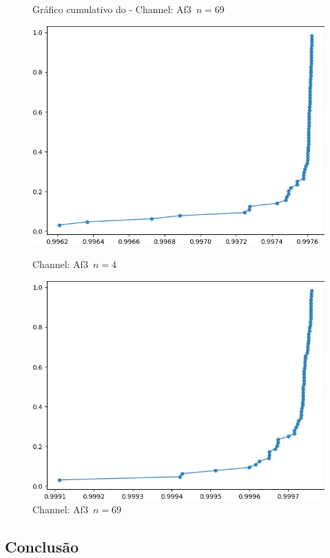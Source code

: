 \begin{figure}[ht]
  \caption{Gráfico cumulativo do \dmc - Channel: Af3~$n = 69$}
  \begin{minipage}[b]{0.45\textwidth}
    \includegraphics[width=\textwidth]{../Figures/test_dmc/pdcca_of_Af3._n_4.png}
    \caption{Channel: Af3~$n = 4$}
  \end{minipage}
  \hfill
  \begin{minipage}[b]{0.45\textwidth}
    \includegraphics[width=\textwidth]{../Figures/test_dmc/pdcca_of_Af3._n_69.png}
    \caption{Channel: Af3~$n = 69$}
  \end{minipage}
\end{figure}


\subsection{Conclusão}

